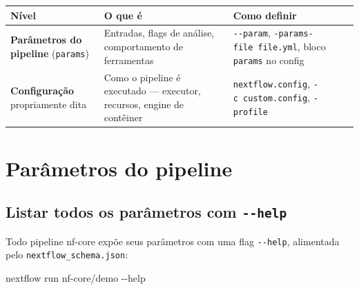\documentclass[
  brazilian,
  letterpaper,
  DIV=11,
  numbers=noendperiod]{scrreprt}
\newenvironment{Shaded}{\begin{snugshade}}{\end{snugshade}}
\newcommand{\AttributeTok}[1]{\textcolor[rgb]{0.40,0.45,0.13}{#1}}
\newcommand{\ExtensionTok}[1]{\textcolor[rgb]{0.00,0.23,0.31}{#1}}
\newcommand{\NormalTok}[1]{\textcolor[rgb]{0.00,0.23,0.31}{#1}}
\newcounter{none} %
\begin{document}
{\def\LTcaptype{none} %
\begin{longtable}[]{@{}
  >{\raggedright\arraybackslash}p{}
  >{\raggedright\arraybackslash}p{}
  >{\raggedright\arraybackslash}p{}@{}}
\toprule\noalign{}
\begin{minipage}[b]{\linewidth}\raggedright
Nível
\end{minipage} & \begin{minipage}[b]{\linewidth}\raggedright
O que é
\end{minipage} & \begin{minipage}[b]{\linewidth}\raggedright
Como definir
\end{minipage} \\
\midrule\noalign{}
\endhead
\bottomrule\noalign{}
\endlastfoot
\textbf{Parâmetros do pipeline} (\texttt{params}) & Entradas, flags de
análise, comportamento de ferramentas & \texttt{-\/-param},
\texttt{-params-file\ file.yml}, bloco \texttt{params} no config \\
\textbf{Configuração} propriamente dita & Como o pipeline é executado
--- executor, recursos, engine de contêiner & \texttt{nextflow.config},
\texttt{-c\ custom.config}, \texttt{-profile} \\
\end{longtable}
}

\section{Parâmetros do pipeline}\label{paruxe2metros-do-pipeline}

\subsection{\texorpdfstring{Listar todos os parâmetros com
\texttt{-\/-help}}{Listar todos os parâmetros com -\/-help}}\label{listar-todos-os-paruxe2metros-com---help}

Todo pipeline nf-core expõe seus parâmetros com uma flag
\texttt{-\/-help}, alimentada pelo \texttt{nextflow\_schema.json}:

\begin{Shaded}
\begin{Highlighting}[]
\ExtensionTok{nextflow}\NormalTok{ run nf{-}core/demo }\AttributeTok{{-}{-}help}
\end{Highlighting}
\end{Shaded}
\end{document}
